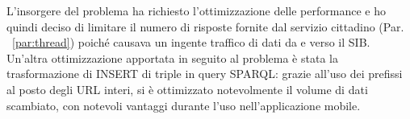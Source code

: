 \noindent
L'insorgere del problema ha richiesto l'ottimizzazione delle performance e ho quindi deciso di limitare il numero di risposte fornite dal servizio cittadino (Par. ~\ref{par:thread}) poiché causava un ingente traffico di dati da e verso il SIB. Un'altra ottimizzazione apportata in seguito al problema è stata la trasformazione di INSERT di triple in query SPARQL: grazie all'uso dei prefissi al posto degli URL interi, si è ottimizzato notevolmente il volume di dati scambiato, con notevoli vantaggi durante l'uso nell'applicazione mobile.









